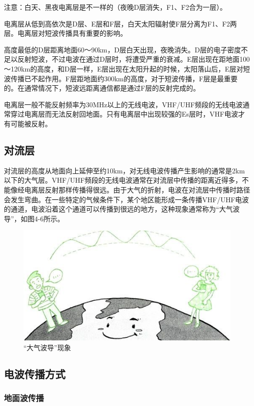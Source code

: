 \documentclass[12pt,UTF8]{ctexbook}
\begin{document}
注意：白天、黑夜电离层是不一样的（夜晚D层消失，F1、F2合为一层）。

电离层从低到高依次是D层、E层和F层，白天太阳辐射使F层分离为F1、F2两层。电离层对短波传播具有重要的影响。

高度最低的D层距离地面60～90km，D层白天出现，夜晚消失。D层的电子密度不足以反射短波，不过电波在通过D层时，将遭受严重的衰减。E层出现在距地面100～120km的高度，和D层一样，E层出现在太阳升起的时候，太阳落山后，E层对短波传播已不起作用。F层距地面约300km的高度，对于短波传播，F层是最重要的。在通常情况下，短波远距离通信都是通过F层的反射完成的。

电离层一般不能反射频率为30MHz以上的无线电波，VHF/UHF频段的无线电波通常穿过电离层而无法反射回地面。只有电离层中出现较强的Es层时，VHF电波才有可能被反射。

\subsection{对流层}

对流层的高度从地面向上延伸至约10km，对无线电波传播产生影响的通常是2km以下的大气层。VHF/UHF频段的无线电波通常在对流层中传播的距离近得多，不能像经电离层反射那样传播得很远。由于大气的折射，电波在对流层中传播时路径会发生弯曲。在一些特定的气候条件下，某个地区能形成一条传播VHF/UHF电波的通道，电波沿着这个通道可以传播到很远的地方，这种现象通常称为“大气波导”，如图4-6所示。

\begin{figure}[htbp]
	\centering
	\includegraphics[width=0.7\linewidth]{49}
	\caption{“大气波导”现象}
	\label{fig:1}
\end{figure}

\subsection{电波传播方式}

\subsubsection{地面波传播}
\end{document}
